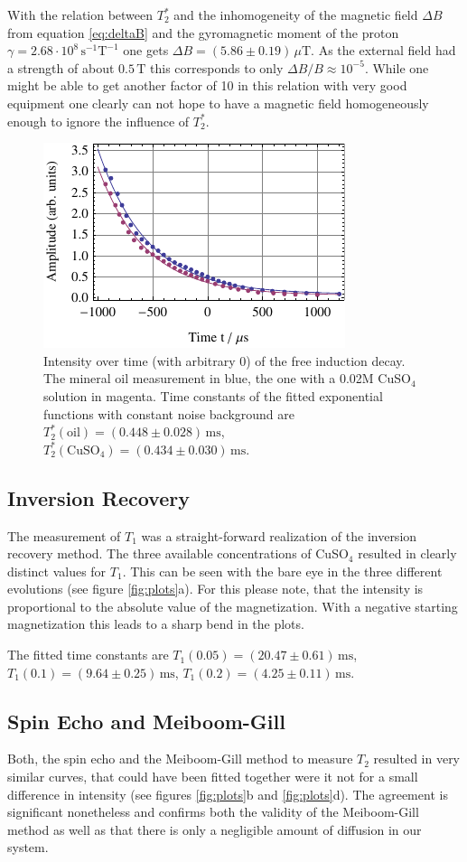 \documentclass[a4paper]{scrartcl}
\numberwithin{equation}{section}
\numberwithin{figure}{section}
\numberwithin{table}{section}
\begin{document}
With the relation between $T_2^*$ and the inhomogeneity of the magnetic field $\Delta B$ from equation \ref{eq:deltaB} and the gyromagnetic moment of the proton $\gamma=2.68\cdot 10^8 \, \text{s}^{-1}\text{T}^{-1}$ one gets $\Delta B = (5.86\pm 0.19)\,\mu\text{T}$. As the external field had a strength of about $0.5\,\text{T}$ this corresponds to only $\Delta B / B \approx 10^{-5}$. While one might be able to get another factor of 10 in this relation with very good equipment one clearly can not hope to have a magnetic field homogeneously enough to ignore the influence of $T_2^*$.

\begin{figure}
\centering
	\includegraphics[width=0.5\linewidth]{img/t2st.pdf}
	\caption{\small Intensity over time (with arbitrary 0) of the free induction decay. The mineral oil measurement in blue, the one with a 0.02M CuSO$_4$ solution in magenta. Time constants of the fitted exponential functions with constant noise background are $T_2^*(\text{oil})=(0.448\pm 0.028)\,\text{ms}$, $T_2^*(\text{CuSO}_4)=(0.434\pm 0.030)\,\text{ms}$. }
	\label{fig:fid}
\end{figure}

\subsection{Inversion Recovery}
The measurement of $T_1$ was a straight-forward realization of the inversion recovery method. The three available concentrations of CuSO$_4$ resulted in clearly distinct values for $T_1$. This can be seen with the bare eye in the three different evolutions (see figure \ref{fig:plots}a). For this please note, that the intensity is proportional to the absolute value of the magnetization. With a negative starting magnetization this leads to a sharp bend in the plots.

The fitted time constants are $T_1(0.05)=(20.47\pm 0.61)\,\text{ms}$, $T_1(0.1)=(9.64\pm 0.25)\,\text{ms}$, $T_1(0.2)=(4.25\pm 0.11)\,\text{ms}$.

\subsection{Spin Echo and Meiboom-Gill}
Both, the spin echo and the Meiboom-Gill method to measure $T_2$ resulted in very similar curves, that could have been fitted together were it not for a small difference in intensity (see figures \ref{fig:plots}b and \ref{fig:plots}d). The agreement is significant nonetheless and confirms both the validity of the Meiboom-Gill method as well as that there is only a negligible amount of diffusion in our system.
\end{document}
